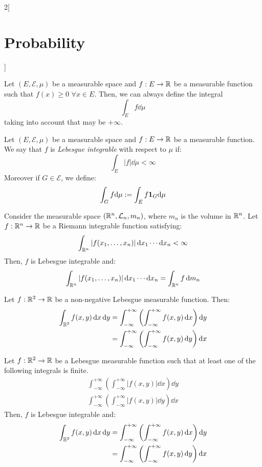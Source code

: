 \documentclass[../../../main.tex]{subfiles}
\begin{document}
\begin{multicols}{2}[\section{Probability}]
\begin{definition}
  \end{definition}
  \begin{proposition}
    Let $(E,\mathcal{E},\mu)$ be a measurable space and $f:E\rightarrow\mathbb{R}$ be a measurable function such that $f(x)\geq 0$ $\forall x\in E$. Then, we can always define the integral $$\int_Ef\dd\mu$$ taking into account that may be $+\infty$.
  \end{proposition}
  \begin{definition}
    Let $(E,\mathcal{E},\mu)$ be a measurable space and $f:E\rightarrow\mathbb{R}$ be a measurable function. We say that $f$ is \emph{Lebesgue integrable} with respect to $\mu$ if: $$\int_E|f|\dd\mu<\infty$$
    Moreover if $G\in\mathcal{E}$, we define: $$\int_Gf\dd\mu:=\int_Ef\boldsymbol{\mathrm{1}}_G\dd\mu$$
  \end{definition}
  \begin{proposition}
    Consider the measurable space $(\mathbb{R}^n,\mathcal{L}_n,m_n)$, where $m_n$ is the volume in $\mathbb{R}^n$. Let $f:\mathbb{R}^n\rightarrow\mathbb{R}$ be a Riemann integrable function satisfying: $$\int_{\mathbb{R}^n}|f(x_1,\ldots,x_n)|\dd{x_1}\cdots\dd{x_n}<\infty$$
    Then, $f$ is Lebesgue integrable and: $$\int_{\mathbb{R}^n}|f(x_1,\ldots,x_n)|\dd{x_1}\cdots\dd{x_n}=\int_{\mathbb{R}^n}f\dd{m_n}$$
  \end{proposition}
  \begin{theorem}
    Let $f:\mathbb{R}^2\rightarrow\mathbb{R}$ be a non-negative Lebesgue measurable function. Then:
    \begin{align*}
      \int_{\mathbb{R}^2}f(x,y)\dd{x}\dd{y} & =\int_{-\infty}^{+\infty}\left(\int_{-\infty}^{+\infty}f(x,y)\dd{x}\right)\dd{y} \\
                                     & =\int_{-\infty}^{+\infty}\left(\int_{-\infty}^{+\infty}f(x,y)\dd{y}\right)\dd{x}
    \end{align*}
  \end{theorem}
  \begin{theorem}
    Let $f:\mathbb{R}^2\rightarrow\mathbb{R}$ be a Lebesgue measurable function such that at least one of the following integrals is finite.
    \begin{gather*}
      \int_{-\infty}^{+\infty}\left(\int_{-\infty}^{+\infty}|f(x,y)|\dd{x}\right)\dd{y}\\
      \int_{-\infty}^{+\infty}\left(\int_{-\infty}^{+\infty}|f(x,y)|\dd{y}\right)\dd{x}
    \end{gather*}
    Then, $f$ is Lebesgue integrable and:
    \begin{align*}
      \int_{\mathbb{R}^2}f(x,y)\dd{x}\dd{y} & =\int_{-\infty}^{+\infty}\left(\int_{-\infty}^{+\infty}f(x,y)\dd{x}\right)\dd{y} \\
                                     & =\int_{-\infty}^{+\infty}\left(\int_{-\infty}^{+\infty}f(x,y)\dd{y}\right)\dd{x}
    \end{align*}
  \end{theorem}

\end{multicols}
\end{document}
